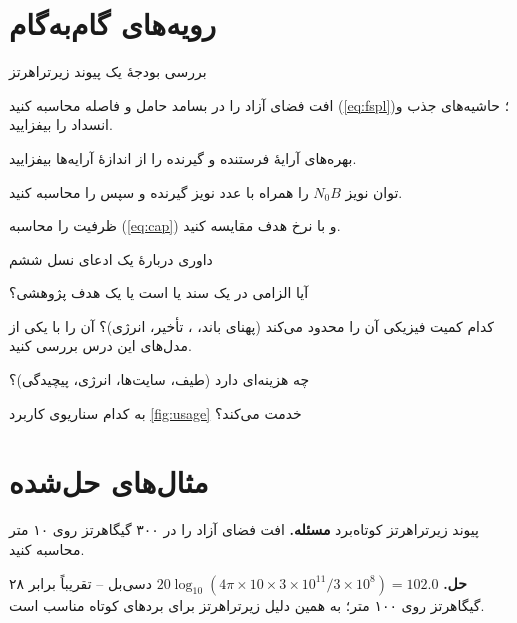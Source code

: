 \documentclass[11pt,a4paper]{article}
\begin{document}
\section{رویه‌های گام‌به‌گام}

\begin{procedurebox}{بررسی بودجهٔ یک پیوند زیرتراهرتز}\label{proc:budget}
\begin{steps}
  \item افت فضای آزاد را در بسامد حامل و فاصله محاسبه کنید (\cref{eq:fspl})؛ حاشیه‌های جذب و انسداد را بیفزایید.
  \item بهره‌های آرایهٔ فرستنده و گیرنده را از اندازهٔ آرایه‌ها بیفزایید.
  \item توان نویز $N_0B$ را همراه با عدد نویز گیرنده و سپس  را محاسبه کنید.
  \item ظرفیت را محاسبه (\cref{eq:cap}) و با نرخ هدف مقایسه کنید.
\end{steps}
\end{procedurebox}

\begin{procedurebox}{داوری دربارهٔ یک ادعای نسل ششم}\label{proc:claim}
\begin{steps}
  \item آیا الزامی در یک سند  یا  است یا یک هدف پژوهشی؟
  \item کدام کمیت فیزیکی آن را محدود می‌کند (پهنای باند، ، تأخیر، انرژی)؟ آن را با یکی از مدل‌های این درس بررسی کنید.
  \item چه هزینه‌ای دارد (طیف، سایت‌ها، انرژی، پیچیدگی)؟
  \item به کدام سناریوی کاربرد \cref{fig:usage} خدمت می‌کند؟
\end{steps}
\end{procedurebox}

\section{مثال‌های حل‌شده}

\begin{examplebox}{پیوند زیرتراهرتز کوتاه‌برد}\label{ex:thz}
\textbf{مسئله.} افت فضای آزاد را در ۳۰۰ گیگاهرتز روی ۱۰ متر محاسبه کنید.

\textbf{حل.} $20\log_{10}(4\pi\times10\times3\times10^{11}/3\times10^{8}) = 102.0$ دسی‌بل -- تقریباً برابر ۲۸ گیگاهرتز روی ۱۰۰ متر؛ به همین دلیل زیرتراهرتز برای
بردهای کوتاه مناسب است.
\end{examplebox}
\end{document}
